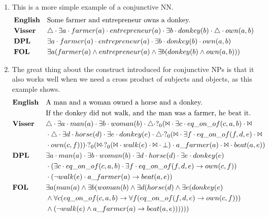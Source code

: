 \documentclass[12pt]{article}
\begin{document}
\begin{enumerate}
\item
This is a more simple example of a conjunctive NN.
\begin{align*}
&\text{\textbf{English}}&&\text{Some farmer and entrepreneur owns a donkey.} \\
&\text{\textbf{Visser}}&&\triangle \cdot \exists a \cdot farmer(a) \cdot entrepreneur(a) \cdot  \exists b \cdot donkey(b) \cdot \triangle \cdot own(a,b) \\
&\text{\textbf{DPL}}&&\exists a \cdot farmer(a) \cdot entrepreneur(a) \cdot \exists b \cdot donkey(b) \cdot own(a,b) \\
&\text{\textbf{FOL}}&&\exists a(farmer(a) \wedge entrepreneur(a) \wedge \exists b(donkey(b) \wedge own(a,b))) \\
\end{align*}
\item
The great thing about the construct introduced for conjunctive NPs is that it also works well when we need a cross product of subjects and objects, as this example shows.
\begin{align*}
&\text{\textbf{English}}&&\text{A man and a woman owned a horse and a donkey.}\\&&&\text{If the donkey did not walk, and the man was a farmer, he beat it.} \\
&\text{\textbf{Visser}}&&\triangle \cdot \exists a \cdot man(a) \cdot  \exists b \cdot woman(b) \cdot \triangle \cdot ?_0(\Bowtie \cdot \exists c \cdot eq\_on\_of(c,a,b) \cdot \Bowtie\\&&&\cdot \triangle \cdot \exists d \cdot horse(d) \cdot  \exists e \cdot donkey(e) \cdot \triangle \cdot ?_0(\Bowtie \cdot \exists f \cdot eq\_on\_of(f,d,e) \cdot \Bowtie\\&&&\cdot own(c,f))) \cdot ?_0(\Bowtie \cdot ?_0(\Bowtie \cdot walk(e) \cdot \Bowtie \cdot \bot) \cdot a\_farmer(a) \cdot \Bowtie \cdot beat(a,e)) \\
&\text{\textbf{DPL}}&&\exists a \cdot man(a) \cdot \exists b \cdot woman(b) \cdot \exists d \cdot horse(d) \cdot \exists e \cdot donkey(e)\\&&&\cdot (\exists c \cdot eq\_on\_of(c,a,b) \cdot \exists f \cdot eq\_on\_of(f,d,e) \rightarrow own(c,f))\\&&&\cdot (\neg walk(e) \cdot a\_farmer(a) \rightarrow beat(a,e)) \\
&\text{\textbf{FOL}}&&\exists a(man(a) \wedge \exists b(woman(b) \wedge \exists d(horse(d) \wedge \exists e(donkey(e)\\&&&\wedge \forall c(eq\_on\_of(c,a,b) \rightarrow \forall f(eq\_on\_of(f,d,e) \rightarrow own(c,f)))\\&&&\wedge (\neg walk(e) \wedge a\_farmer(a) \rightarrow beat(a,e)))))) \\

\end{align*}
\end{enumerate}
\end{document}
